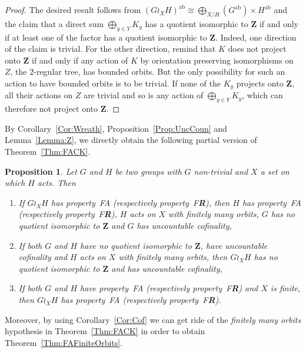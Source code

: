 \documentclass[a4paper]{article}
\newtheorem{prop}[lem]{Proposition}
\theoremstyle{definition}
\DeclareMathOperator\ab{ab}
\newcommand*{\field}[1]{\mathbf{#1}}
\newcommand*{\Z}{\field{Z}}
\newcommand*{\FA}{FA}
\newcommand*{\FR}{F\textbf{R}}
\begin{document}
\begin{proof}
The desired result follows from $(G\wr_XH)^{\ab}\cong \bigoplus_{X/H}(G^{\ab})\times H^{\ab}$ and the claim that a direct sum $\bigoplus_{y\in Y}K_y$ has a quotient isomorphic to $\Z$ if and only if at least one of the factor has a quotient isomorphic to $\Z$.
Indeed, one direction of the claim is trivial.
For the other direction, remind that $K$ does not project onto $\Z$ if and only if any action of $K$ by orientation preserving isomorphisms on $Z$, the $2$-regular tree, has bounded orbits. But the only possibility for such an action to have bounded orbits is to be trivial.
If none of the $K_y$ projects onto $\Z$, all their actions on $Z$ are trivial and so is any action of $\bigoplus_{y\in Y}K_y$, which can therefore not project onto $\Z$.
\end{proof}
%
%
By Corollary~\ref{Cor:Wreath}, Proposition~\ref{Prop:UncCoun} and Lemma~\ref{Lemma:Z}, we directly obtain the following partial version of Theorem~\ref{Thm:FACK}.
%
%
\begin{prop}\label{Prop:WRFA}
Let $G$ and $H$ be two groups with $G$ non-trivial and $X$ a set on which $H$ acts.
Then
\begin{enumerate}
\item If $G\wr_XH$ has property~\FA{} (respectively property~\FR), then $H$ has property~\FA{} (respectively property~\FR), $H$ acts on $X$ with finitely many orbits, $G$ has no quotient isomorphic to $\Z$ and $G$ has uncountable cofinality,
\item If both $G$ and $H$ have no quotient isomorphic to $\Z$, have uncountable cofinality and $H$ acts on $X$ with finitely many orbits, then $G\wr_XH$ has no quotient isomorphic to $\Z$ and has uncountable cofinality,
\item If both $G$ and $H$ have property~\FA{} (respectively property~\FR) and $X$ is finite, then $G\wr_XH$ has property~FA (respectively property~\FR).
\end{enumerate}
\end{prop}
%
%
Moreover, by using Corollary~\ref{Cor:Cof} we can get ride of the \emph{finitely many orbits} hypothesis in Theorem~\ref{Thm:FACK} in order to obtain Theorem~\ref{Thm:FAFiniteOrbits}.
\end{document}
